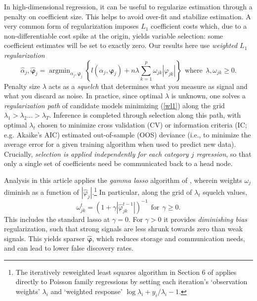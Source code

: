 \documentclass[12pt]{article}
\newcommand{\bs}[1]{\boldsymbol{#1}}
\DeclareMathOperator*{\argmin}{argmin}
\begin{document}
In high-dimensional regression, it can be useful to regularize estimation
through a penalty on coefficient size.   This helps  to avoid over-fit and
stabilize estimation.
A very common form of regularization imposes $L_1$ coefficient costs
\citep[i.e., the lasso of][]{tibshirani_regression_1996} which, due to
a non-differentiable cost spike at the origin, yields variable selection: some
coefficient estimates will be set to exactly zero.  Our results here use {\it
weighted $L_1$ regularization}
\begin{equation}\label{wl1}
 \hat\alpha_j,\bs{\hat\varphi}_j = \argmin_{\alpha_j,\bs{\varphi}_j} \left\{l(\alpha_j,\bs{\varphi}_j) + n \lambda \sum_{k=1}^p \omega_{jk} |\varphi_{jk} |\right\} ~~\text{where}~~\lambda,\omega_{jk} \geq 0.
\end{equation}
Penalty size $\lambda$ acts as a {\it squelch} that determines what you
measure as signal and what you discard as noise. In practice, since optimal
$\lambda$ is unknown, one solves a {\it regularization path} of candidate
models minimizing (\ref{wl1}) along the grid $\lambda_1 >
\lambda_2 \ldots > \lambda_T$.  Inference is completed through selection
along this path, with optimal $\lambda_t$ chosen to minimize cross validation
(CV) or information criteria (IC; e.g. Akaike's AIC) estimated
out-of-sample (OOS) deviance (i.e., to minimize the average error for a given
training algorithm when used to predict new data).  Crucially,  {\it selection is
applied independently for each category $j$ regression}, so that only a single
set of coefficients need be communicated back to a head node. 

Analysis in this article applies the {\it gamma lasso} algorithm  of
\citet{taddy_gamma_2013}, wherein weights $\omega_j$ diminish as a
function of $|\hat\varphi_j|$.\footnote{The iteratively reweighted least
squares algorithm in Section 6 of \citet{taddy_gamma_2013} applies directly to Poisson
family regressions by setting each iteration's `observation weights' $\lambda_i$ and
`weighted response' $\log\lambda_i + y_i/\lambda_i - 1$.}  In particular,
along the grid of $\lambda_t$ squelch values,
\begin{equation}\label{glweight}
\omega^{t}_{jk}  = \left(1 + \gamma
|\hat\varphi^{t-1}_{jk}|\right)^{-1} ~~\text{for}~~\gamma \geq 0.
\end{equation} 
This includes the standard lasso at $\gamma=0$.  For $\gamma>0$ it provides
{\it diminishing bias} regularization, such that strong signals are less
shrunk towards zero than  weak signals. This yields
sparser $\bs{\hat
\varphi}$, which reduces storage and communication needs, and can
 lead to lower false discovery rates.  
\end{document}
